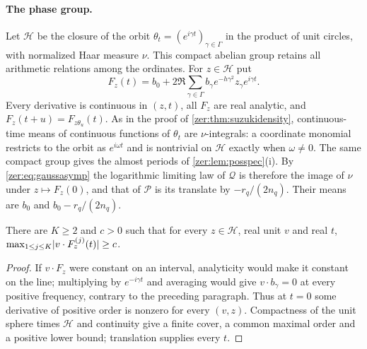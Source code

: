 \paragraph{The phase group.}
Let $\mathcal H$ be the closure of the orbit $\theta_t=(e^{i\gamma t})_{\gamma\in\Gamma}$ in the
product of unit circles, with normalized Haar measure $\nu$. This compact abelian group retains
all arithmetic relations among the ordinates. For $z\in\mathcal H$ put
\[
 F_z(t)=b_0+2\Re\sum_{\gamma\in\Gamma}b_\gamma e^{-h\gamma^2}z_\gamma e^{i\gamma t}.
\]
Every derivative is continuous in $(z,t)$, all $F_z$ are real analytic, and
$F_z(t+u)=F_{z\theta_u}(t)$. As in the proof of \cref{zer:thm:suzukidensity}, continuous-time
means of continuous functions of $\theta_t$ are $\nu$-integrals: a coordinate monomial restricts to
the orbit as $e^{i\omega t}$ and is nontrivial on $\mathcal H$ exactly when $\omega\ne0$. The same
compact group gives the almost periods of \cref{zer:lem:posspec}(i). By \eqref{zer:eq:gaussasymp}
the logarithmic limiting law of $\mathcal Q$ is
therefore the image of $\nu$ under $z\mapsto F_z(0)$, and that of $\mathcal P$ is its translate by
$-r_q/(2n_q)$. Their means are $b_0$ and $b_0-r_q/(2n_q)$.

\begin{lemma}\label{zer:lem:gausstype}
There are $K\ge2$ and $c>0$ such that for every $z\in\mathcal H$, real unit $v$ and real $t$,
$\max_{1\le j\le K}\lvert v\cdot F_z^{(j)}(t)\rvert\ge c$.
\end{lemma}
\begin{proof}
If $v\cdot F_z$ were constant on an interval, analyticity would make it constant on the line;
multiplying by $e^{-i\gamma t}$ and averaging would give $v\cdot b_\gamma=0$ at every positive
frequency, contrary to the preceding paragraph. Thus at $t=0$ some derivative of positive order
is nonzero for every $(v,z)$. Compactness of the unit sphere times $\mathcal H$ and continuity
give a finite cover, a common maximal order and a positive lower bound; translation supplies
every $t$.
\end{proof}

